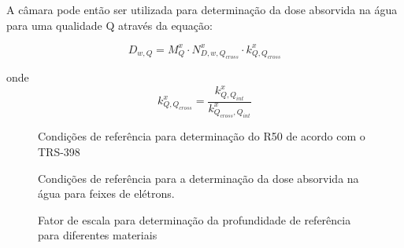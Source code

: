 \documentclass[11pt,a4paper]{article}
\begin{document}
	A câmara pode então ser utilizada para determinação da dose absorvida na água para uma qualidade Q através da equação:

	$$D_{w,Q} = M_{Q}^{x}\cdot N_{D,w,Q_{cross}}^{x} \cdot k_{Q,Q_{cross}}^{x} $$

	onde $$k_{Q,Q_{cross}}^{x} = \frac{k_{Q,Q_{int}}^{x}}{k_{Q_{cross}, Q_{int}}^{x}}$$

	\begin{figure}[h]
		\centering
		\caption{Condições de referência para determinação do R50 de acordo com o TRS-398}
		\label{fig:condicoesReferenciasR50}
	\end{figure}

	\begin{figure}[h]
		\centering
		\caption{Condições de referência para a determinação da dose absorvida na água para feixes de elétrons.}
		\label{fig:condicoesReferenciasDoseEletrons}
	\end{figure}

	\begin{figure}[h]
		\centering
		\caption{Fator de escala para determinação da profundidade de referência para diferentes materiais}
		\label{fig:fatorEscalaPhantons}
	\end{figure}
\end{document}
